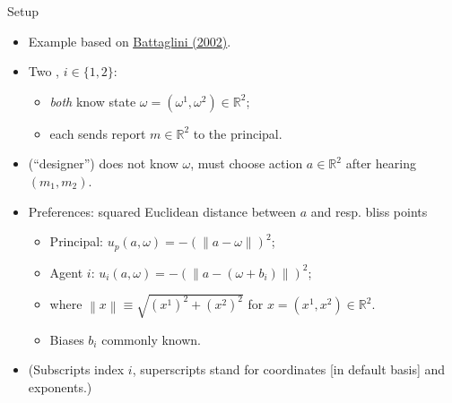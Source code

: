 \documentclass[english,10pt
,aspectratio=169
]{beamer}
\begin{document}
\begin{frame}{Setup}
\begin{itemize}
	\item Example based on \href{https://onlinelibrary.wiley.com/doi/abs/10.1111/1468-0262.00336}{\uline{Battaglini (2002)}}.
	\item Two , $i \in \{1,2\}$:
	\begin{itemize}
		\item \emph{both} know \alert{state} $\omega = (\omega^1,\omega^2) \in \mathbb{R}^2$;
		\item each sends \alert{report} $m \in \mathbb{R}^2$ to the principal.
	\end{itemize}
	\item {} (``designer'') does not know $\omega$, must choose action $a \in \mathbb{R}^2$ \alert{after} hearing $(m_1,m_2)$.
	\item Preferences: squared Euclidean distance between $a$ and resp. \alert{bliss points}
	\begin{itemize}
		\item Principal: $u_p (a,\omega) = -\left(\left\|a-\omega\right\| \right)^2$;
		\item Agent $i$: $u_i (a,\omega) = -\left(\left\|a-(\omega+b_i)\right\| \right)^2$;
		\item where $\left\|x\right\| \equiv \sqrt{(x^1)^2 + (x^2)^2}$ for $x = (x^1,x^2) \in \mathbb{R}^2$.
		\item \alert{Biases} $b_i$ commonly known.
	\end{itemize}
	\item (Subscripts index $i$, superscripts stand for coordinates [in default basis] and exponents.)
\end{itemize}
\end{frame}
\end{document}
